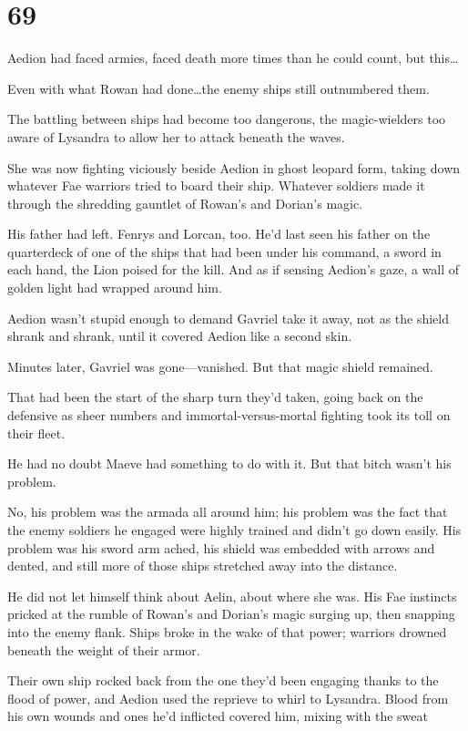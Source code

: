 
\chapter{69}

Aedion had faced armies, faced death more times than he could count, but this\ldots

Even with what Rowan had done\ldots the enemy ships still outnumbered them.

The battling between ships had become too dangerous, the magic-wielders too aware of Lysandra to allow her to attack beneath the waves.

She was now fighting viciously beside Aedion in ghost leopard form, taking down whatever Fae warriors tried to board their ship. Whatever soldiers made it through the shredding gauntlet of Rowan's and Dorian's magic.

His father had left. Fenrys and Lorcan, too. He'd last seen his father on the quarterdeck of one of the ships that had been under his command, a sword in each hand, the Lion poised for the kill. And as if sensing Aedion's gaze, a wall of golden light had wrapped around him.

Aedion wasn't stupid enough to demand Gavriel take it away, not as the shield shrank and shrank, until it covered Aedion like a second skin.

Minutes later, Gavriel was gone---vanished. But that magic shield remained.

That had been the start of the sharp turn they'd taken, going back on the defensive as sheer numbers and immortal-versus-mortal fighting took its toll on their fleet.

He had no doubt Maeve had something to do with it. But that bitch wasn't his problem.

No, his problem was the armada all around him; his problem was the fact that the enemy soldiers he engaged were highly trained and didn't go down easily. His problem was his sword arm ached, his shield was embedded with arrows and dented, and still more of those ships stretched away into the distance.

He did not let himself think about Aelin, about where she was. His Fae instincts pricked at the rumble of Rowan's and Dorian's magic surging up, then snapping into the enemy flank. Ships broke in the wake of that power; warriors drowned beneath the weight of their armor.

Their own ship rocked back from the one they'd been engaging thanks to the flood of power, and Aedion used the reprieve to whirl to Lysandra. Blood from his own wounds and ones he'd inflicted covered him, mixing with the sweat

